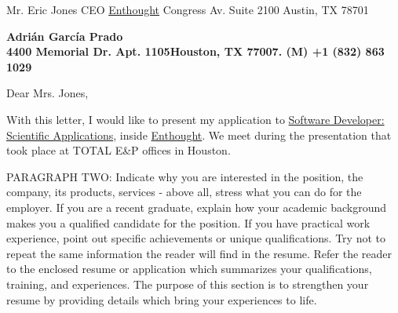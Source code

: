 \documentclass[11pt]{letter} %
\newcommand{\fullName}{Adri\'an Garc\'ia Prado}
\newcommand{\PersonalAddress}{4400 Memorial Dr. Apt. 1105\newline Houston, TX 77007.}
\newcommand{\phoneMobileLine}{(M) +1 (832) 863 1029}
\newcommand{\webEnthoughtCompany}{https://www.enthought.com/}
\newcommand{\webEnthoughtSoftwareDevPosition}{https://www.enthought.com/company/careers/software-developer-scientific-applications/}
\begin{document}

\begin{letter}{Mr. Eric Jones \newline
CEO \newline
\href{\webEnthoughtCompany}{Enthought}  Congress Av. Suite 2100 \newline
Austin, TX 78701}

% 
\begin{center}
\large\bf{\fullName} \\ %
\PersonalAddress\newline
\phoneMobileLine %
\end{center} 
\vfill

\signature{John Smith} %


\opening{Dear Mrs. Jones,} 
 
With this letter, I would like to present my application to \href{\webEnthoughtSoftwareDevPosition}{Software Developer: Scientific Applications}, inside \href{\webEnthoughtCompany}{Enthought}. We meet during the presentation that took place at TOTAL E\&P offices in Houston.


PARAGRAPH TWO: Indicate why you are interested in the position, the company, its products, services - above all, stress what you can do for the employer. If you are a recent graduate, explain how your academic background makes you a qualified candidate for the position. If you have practical work experience, point out specific achievements or unique qualifications. Try not to repeat the same information the reader will find in the resume. Refer the reader to the enclosed resume or application which summarizes your qualifications, training, and experiences. The purpose of this section is to strengthen your resume by providing details which bring your experiences to life. 
 

\end{letter}
\end{document}
